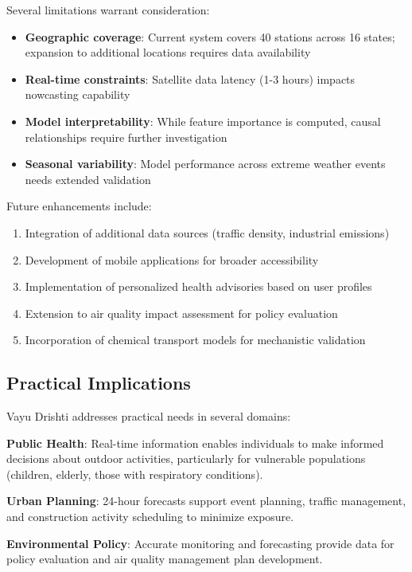 \documentclass[12pt]{article}
\begin{document}
Several limitations warrant consideration:

\begin{itemize}
\item \textbf{Geographic coverage}: Current system covers 40 stations across 16 states; expansion to additional locations requires data availability
\item \textbf{Real-time constraints}: Satellite data latency (1-3 hours) impacts nowcasting capability
\item \textbf{Model interpretability}: While feature importance is computed, causal relationships require further investigation
\item \textbf{Seasonal variability}: Model performance across extreme weather events needs extended validation
\end{itemize}

Future enhancements include:

\begin{enumerate}
\item Integration of additional data sources (traffic density, industrial emissions)
\item Development of mobile applications for broader accessibility
\item Implementation of personalized health advisories based on user profiles
\item Extension to air quality impact assessment for policy evaluation
\item Incorporation of chemical transport models for mechanistic validation
\end{enumerate}

\subsection{Practical Implications}

Vayu Drishti addresses practical needs in several domains:

\textbf{Public Health}: Real-time information enables individuals to make informed decisions about outdoor activities, particularly for vulnerable populations (children, elderly, those with respiratory conditions).

\textbf{Urban Planning}: 24-hour forecasts support event planning, traffic management, and construction activity scheduling to minimize exposure.

\textbf{Environmental Policy}: Accurate monitoring and forecasting provide data for policy evaluation and air quality management plan development.
\end{document}
